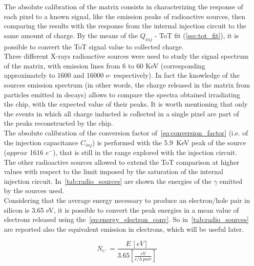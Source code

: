 The absolute calibration of the matrix consists in characterizing the response of each pixel to a known signal, like the emission peaks of radioactive sources, then comparing the results with the response from the internal injection circuit to the same amount of charge. By the means of the $Q_{inj}$ - ToT fit (\autoref{sec:tot_fit}), it is possible to convert the ToT signal value to collected charge.\\
Three different X-rays radioactive sources were used to study the signal spectrum of the matrix, with emission lines from 6 to 60 KeV (corresponding approximately to 1600 and 16000 e- respectively).
In fact the knowledge of the sources emission spectrum (in other words, the charge released in the matrix from particles emitted in decays) allows to compare the spectra obtained irradiating the chip, with the expected value of their peaks. It is worth mentioning that only the events in which all charge inducted is collected in a single pixel are part of the peaks reconstructed by the chip.\\
The absolute calibration of the conversion factor of~\autoref{eq:conversion_factor} (i.e. of the injection capacitance $C_{inj}$) is performed with the \SI{5.9}{KeV} peak of the  source ($approx$ 1616 $e^{-}$), that is still in the range explored with the injection circuit. The other radioactive sources allowed to extend the ToT comparison at higher values with respect to the limit imposed by the saturation of the internal injection circuit. In~\autoref{tab:radio_sources} are shown the energies of the $\gamma$ emitted by the sources used.\\
Considering that the average energy necessary to produce an electron/hole pair in silicon is 3.65 eV, it is possible to convert the peak energies in a mean value of electrons released using the~\autoref{eq:energy_electron_conv}. So in~\autoref{tab:radio_sources} are reported also the equivalent emission in electrons, which will be useful later.

\begin{equation}
N_{e^{-}} = \frac{E \, [eV]}{3.65 [\frac{eV}{e/h \, pair}]}
\label{eq:energy_electron_conv}
\end{equation}



